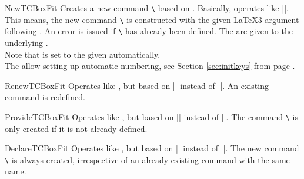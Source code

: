 \clearpage

\begin{docCommand}{NewTCBoxFit}{}
  Creates a new command \texttt{\textbackslash} based on .
  Basically,  operates like |\NewDocumentCommand|. This means,
  the new command \texttt{\textbackslash} is constructed with the given
  \LaTeX3 argument  following \cite{latexproject:usrguide}.
  An error is issued if \texttt{\textbackslash} has already been defined.
  The  are given to the underlying .\\
  Note that  is set to the given 
  automatically.\\
  The  allow setting up automatic numbering,
  see Section \ref{sec:initkeys} from page \pageref{sec:initkeys}.

\end{docCommand}

\begin{docCommand}{RenewTCBoxFit}{}
  Operates like , but based on |\RenewDocumentCommand| instead of |\NewDocumentCommand|.
  An existing command is redefined.
\end{docCommand}

\begin{docCommand}{ProvideTCBoxFit}{}
  Operates like , but based on |\ProvideDocumentCommand| instead of |\NewDocumentCommand|.
  The command \texttt{\textbackslash} is only created if it is not already defined.
\end{docCommand}

\begin{docCommand}{DeclareTCBoxFit}{}
  Operates like , but based on |\DeclareDocumentCommand| instead of |\NewDocumentCommand|.
  The new command \texttt{\textbackslash} is always created, irrespective of an already existing
  command with the same name.
\end{docCommand}

